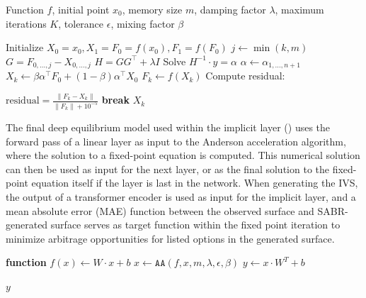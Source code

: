 \begin{algorithm}
    \begin{algorithmic}[1]
        \Require Function \( f \), initial point \( x_0 \), memory size \( m \),
        damping factor \( \lambda \), maximum iterations \( K \), tolerance \( \epsilon \), mixing factor \( \beta \)

        \State Initialize \( X_0 = x_0, X_1 = F_0 = f(x_0), F_1 = f(F_0) \)
            \State \( j \gets \min(k, m) \)
            \State \( G = F_{0, \ldots, j} - X_{ 0, \ldots, j} \)
            \State \( H = G G^\top + \lambda I \)
            \State Solve \( H^{-1} \cdot y = \alpha \)
            \State \( \alpha \gets \alpha_{1, \ldots, n + 1} \)
            \State \( X_k \gets \beta \alpha^\top F_0 + (1 - \beta) \alpha^\top X_0 \)
            \State \( F_k \gets f(X_k) \)
            \State Compute residual:

            $\text{residual} = \frac{\| F_k - X_k \|}{\| F_k \| + 10^{-5}}$
                \State \textbf{break}
            \EndIf
        \EndFor
        \State \Return \( X_k \)
    \end{algorithmic}
    \caption{Equilibrium Model with Anderson Acceleration}
    \label{alg:anderson}
\end{algorithm}

The final deep equilibrium model used within the implicit layer ()
uses the forward pass of a linear layer as input to the Anderson acceleration algorithm, where the solution to a fixed-point equation is computed.
This numerical solution can then be used as input for the next layer, or as the final solution to the fixed-point equation itself if the layer is last in the network.
When generating the IVS, the output of a transformer encoder is used as input for the implicit layer,
and a mean absolute error (MAE) function between the observed surface and SABR-generated surface serves as target function
within the fixed point iteration to minimize arbitrage opportunities for listed options in the generated surface.

\begin{algorithm}
    \begin{algorithmic}[1]
            \State \textbf{function} $f(x) \gets W \cdot x + b$
            \State $x \gets \texttt{AA}(f, x, m, \lambda, \epsilon, \beta)$
            \State $y \gets x \cdot W^{T} + b$

            \State \Return $y$
        \EndFunction
    \end{algorithmic}
    \caption{Implicit layer forward pass with Anderson acceleration (AA).}
    \label{alg:forward}
\end{algorithm}
